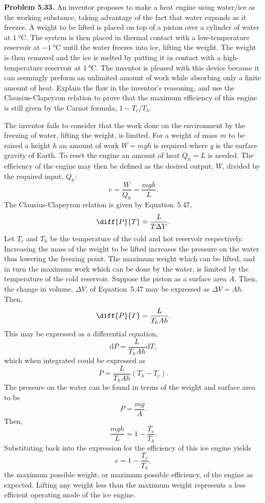 \documentclass[a4paper, 12pt]{config/homework}
\begin{document}
\pagebreak\noindent
\textbf{Problem 5.33.} An inventor proposes to make a heat engine using water/ice as the working substance, taking advantage of the fact that water expands as it freezes. A weight to be lifted is placed on top of a piston over a cylinder of water at \(\qty{1}{\celsius}\). The system is then placed in thermal contact with a low-temperature reservoir at \(\qty{-1}{\celsius}\) until the water freezes into ice, lifting the weight. The weight is then removed and the ice is melted by putting it in contact with a high-temperature reservoir at \(\qty{1}{\celsius}\). The inventor is pleased with this device because it can seemingly preform an unlimited amount of work while absorbing only a finite amount of heat. Explain the flaw in the inventor's reasoning, and use the Clausius-Clapeyron relation to prove that the maximum efficiency of this engine is still given by the Carnot formula, \(1 - T_c/T_h\).

\bigskip\noindent
The inventor fails to consider that the work done on the environment by the freezing of water, lifting the weight, is limited. For a weight of mass \(m\) to be raised a height \(h\) an amount of work \(W=mgh\) is required where \(g\) is the surface gravity of Earth. To reset the engine an amount of heat \(Q_h=L\) is needed. The efficiency of the engine may then be defined as the desired output, \(W\), divided by the required input, \(Q_h\):
\[e = \frac{W}{Q_h} = \frac{mgh}{L}.\]
The Clausius-Clapeyron relation is given by Equation~5.47,
\[\diff{P}{T} = \frac{L}{T\Delta V}.\]
Let \(T_c\) and \(T_h\) be the temperature of the cold and hot reservoir respectively. Increasing the mass of the weight to be lifted increases the pressure on the water thus lowering the freezing point. The maximum weight which can be lifted, and in turn the maximum work which can be done by the water, is limited by the temperature of the cold reservoir. Suppose the piston as a surface area \(A\). Then, the change in volume, \(\Delta V\), of Equation~5.47 may be expressed as \(\Delta V = Ah\). Then,
\[\diff{P}{T} = \frac{L}{T_h A h}.\]
This may be expressed as a differential equation,
\[\text{d}P = \frac{L}{T_h A h} \text{d}T,\]
which when integrated could be expressed as
\[P = \frac{L}{T_h A h} \left(T_h - T_c\right).\]
The pressure on the water can be found in terms of the weight and surface area to be
\[P = \frac{mg}{A}.\]
Then,
\[\frac{mgh}{L} = 1 - \frac{T_c}{T_h}.\]
Substituting back into the expression for the efficiency of this ice engine yields
\[e = 1 - \frac{T_c}{T_h},\]
the maximum possible weight, or maximum possible efficiency, of the engine as expected. Lifting any weight less than the maximum weight represents a less efficient operating mode of the ice engine.
\end{document}

